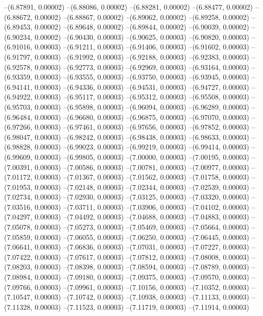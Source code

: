 --(6.87891, 0.00002)
--(6.88086, 0.00002)
--(6.88281, 0.00002)
--(6.88477, 0.00002)
--(6.88672, 0.00002)
--(6.88867, 0.00002)
--(6.89062, 0.00002)
--(6.89258, 0.00002)
--(6.89453, 0.00002)
--(6.89648, 0.00002)
--(6.89844, 0.00002)
--(6.90039, 0.00002)
--(6.90234, 0.00002)
--(6.90430, 0.00003)
--(6.90625, 0.00003)
--(6.90820, 0.00003)
--(6.91016, 0.00003)
--(6.91211, 0.00003)
--(6.91406, 0.00003)
--(6.91602, 0.00003)
--(6.91797, 0.00003)
--(6.91992, 0.00003)
--(6.92188, 0.00003)
--(6.92383, 0.00003)
--(6.92578, 0.00003)
--(6.92773, 0.00003)
--(6.92969, 0.00003)
--(6.93164, 0.00003)
--(6.93359, 0.00003)
--(6.93555, 0.00003)
--(6.93750, 0.00003)
--(6.93945, 0.00003)
--(6.94141, 0.00003)
--(6.94336, 0.00003)
--(6.94531, 0.00003)
--(6.94727, 0.00003)
--(6.94922, 0.00003)
--(6.95117, 0.00003)
--(6.95312, 0.00003)
--(6.95508, 0.00003)
--(6.95703, 0.00003)
--(6.95898, 0.00003)
--(6.96094, 0.00003)
--(6.96289, 0.00003)
--(6.96484, 0.00003)
--(6.96680, 0.00003)
--(6.96875, 0.00003)
--(6.97070, 0.00003)
--(6.97266, 0.00003)
--(6.97461, 0.00003)
--(6.97656, 0.00003)
--(6.97852, 0.00003)
--(6.98047, 0.00003)
--(6.98242, 0.00003)
--(6.98438, 0.00003)
--(6.98633, 0.00003)
--(6.98828, 0.00003)
--(6.99023, 0.00003)
--(6.99219, 0.00003)
--(6.99414, 0.00003)
--(6.99609, 0.00003)
--(6.99805, 0.00003)
--(7.00000, 0.00003)
--(7.00195, 0.00003)
--(7.00391, 0.00003)
--(7.00586, 0.00003)
--(7.00781, 0.00003)
--(7.00977, 0.00003)
--(7.01172, 0.00003)
--(7.01367, 0.00003)
--(7.01562, 0.00003)
--(7.01758, 0.00003)
--(7.01953, 0.00003)
--(7.02148, 0.00003)
--(7.02344, 0.00003)
--(7.02539, 0.00003)
--(7.02734, 0.00003)
--(7.02930, 0.00003)
--(7.03125, 0.00003)
--(7.03320, 0.00003)
--(7.03516, 0.00003)
--(7.03711, 0.00003)
--(7.03906, 0.00003)
--(7.04102, 0.00003)
--(7.04297, 0.00003)
--(7.04492, 0.00003)
--(7.04688, 0.00003)
--(7.04883, 0.00003)
--(7.05078, 0.00003)
--(7.05273, 0.00003)
--(7.05469, 0.00003)
--(7.05664, 0.00003)
--(7.05859, 0.00003)
--(7.06055, 0.00003)
--(7.06250, 0.00003)
--(7.06445, 0.00003)
--(7.06641, 0.00003)
--(7.06836, 0.00003)
--(7.07031, 0.00003)
--(7.07227, 0.00003)
--(7.07422, 0.00003)
--(7.07617, 0.00003)
--(7.07812, 0.00003)
--(7.08008, 0.00003)
--(7.08203, 0.00003)
--(7.08398, 0.00003)
--(7.08594, 0.00003)
--(7.08789, 0.00003)
--(7.08984, 0.00003)
--(7.09180, 0.00003)
--(7.09375, 0.00003)
--(7.09570, 0.00003)
--(7.09766, 0.00003)
--(7.09961, 0.00003)
--(7.10156, 0.00003)
--(7.10352, 0.00003)
--(7.10547, 0.00003)
--(7.10742, 0.00003)
--(7.10938, 0.00003)
--(7.11133, 0.00003)
--(7.11328, 0.00003)
--(7.11523, 0.00003)
--(7.11719, 0.00003)
--(7.11914, 0.00003)
